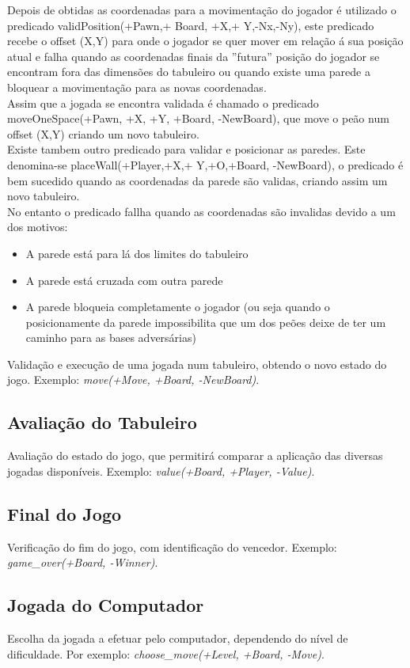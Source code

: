 \documentclass[a4paper]{article}
\begin{document}
Depois de obtidas as coordenadas para a movimentação do jogador é utilizado o predicado validPosition(+Pawn,+ Board, +X,+ Y,-Nx,-Ny), este predicado recebe o offset (X,Y) para onde o jogador se quer mover em relação á sua posição atual e falha quando as coordenadas finais da ''futura'' posição do jogador se encontram fora das dimensões do tabuleiro ou quando existe uma parede a bloquear a movimentação para as novas coordenadas.\\
Assim que a jogada se encontra validada é chamado o predicado moveOneSpace(+Pawn, +X, +Y, +Board, -NewBoard), que move o peão num offset (X,Y) criando um novo tabuleiro.\\
Existe tambem outro predicado para validar e posicionar as paredes. Este denomina-se placeWall(+Player,+X,+ Y,+O,+Board, -NewBoard),  o predicado é bem sucedido quando as coordenadas da parede são validas, criando assim um novo tabuleiro.\\
No entanto o predicado fallha quando as coordenadas são invalidas devido a um dos motivos:
\begin{itemize}
\item A parede está para lá dos limites do tabuleiro
\item A parede está cruzada com outra parede
\item A parede bloqueia completamente o jogador (ou seja quando o posicionamente da parede impossibilita que um dos peões deixe de ter um caminho para as bases adversárias)
\end{itemize}


Validação e execução de uma jogada num tabuleiro, obtendo o novo estado do jogo. Exemplo: \textit{move(+Move, +Board, -NewBoard)}.

\subsection{Avaliação do Tabuleiro} Avaliação do estado do jogo, que permitirá comparar a aplicação das diversas jogadas disponíveis. Exemplo: \textit{value(+Board, +Player, -Value)}.

\subsection{Final do Jogo} Verificação do fim do jogo, com identificação do vencedor. Exemplo: \textit{game\_over(+Board, -Winner)}.

\subsection{Jogada do Computador} Escolha da jogada a efetuar pelo computador, dependendo do nível de dificuldade. Por exemplo: \textit{choose\_move(+Level, +Board, -Move)}.
\end{document}
